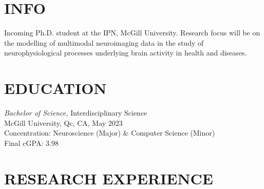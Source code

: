 \documentclass[margin, 10pt]{res} %
\begin{document}
	\begin{resume}
		
		
		\section{INFO}  
		
		Incoming Ph.D. student at the IPN, McGill University. Research focus will be on the modelling of multimodal neuroimaging data in the study of neurophysiological processes underlying brain activity in health and diseases.
		
		
		\section{EDUCATION}
		
		{\sl Bachelor of Science,} Interdisciplinary Science \\
		McGill University, Qc, CA, May 2023 \\
		Concentration: Neuroscience (Major) \& Computer Science (Minor) \\
		Final cGPA: 3.98
		
		
		\section{RESEARCH EXPERIENCE}
		

\end{resume}
\end{document}

